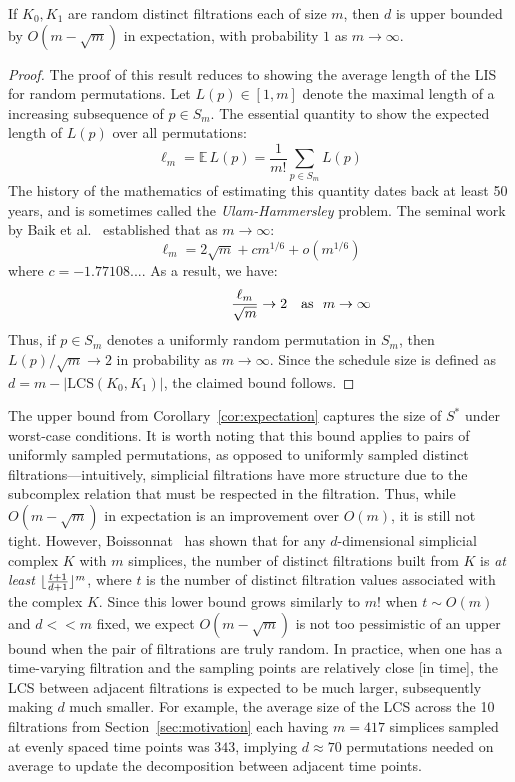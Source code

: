 \documentclass{siamart190516}
\DeclarePairedDelimiter\floor{\lfloor}{\rfloor}
\begin{document}
\begin{corollary}\label{cor:expectation}
	If $K_0, K_1$ are random distinct filtrations each of size $m$, then $d$ is upper bounded by $O(m - \sqrt{m})$ in expectation, with probability $1$ as $m \to \infty$.
\end{corollary}
\begin{proof}
	The proof of this result reduces to showing the average length of the LIS for random permutations. Let $L(p) \in [1,m]$ denote the maximal length of a increasing subsequence of $p \in S_m$. 
	The essential quantity to show the expected length of $L(p)$ over all permutations: 
	$$ \ell_m = \mathbb{E} \, L(p) = \frac{1}{m!} \sum\limits_{p \in S_m} L(p)$$
	The history of the mathematics of estimating this quantity dates back at least 50 years, and is sometimes called the \emph{Ulam-Hammersley} problem. The seminal work by Baik et al.~\cite{baik1999distribution} established that as $m \to \infty$:
	$$ \displaystyle \ell_m = 2 \sqrt{m} + c m^{1/6} + o(m^{1/6}) $$
where $c = -1.77108...$. As a result, we have: 
$$ \frac{\ell_m}{\sqrt{m}} \to 2\rlap{\quad \text{as } $m \to \infty$} $$	 
Thus, if $p \in S_m$ denotes a uniformly random permutation in $S_m$, then $L(p)/\sqrt{m} \to 2$ in probability as $m \to \infty$. 
Since the schedule size is defined as $d = m - \lvert \mathrm{LCS}(K_0, K_1) \rvert$, the claimed bound follows.
\end{proof}
\noindent The upper bound from Corollary~\ref{cor:expectation} captures the size of $S^\ast$ under worst-case conditions. It is worth noting that this bound applies to pairs of uniformly sampled permutations, as opposed to uniformly sampled distinct filtrations---intuitively, simplicial filtrations have more structure due to the subcomplex relation that must be respected in the filtration. Thus, while $O(m - \sqrt{m})$ in expectation is an improvement over $O(m)$, it is still not tight. However, Boissonnat~\cite{boissonnat2018efficient} has shown that for any $d$-dimensional simplicial complex $K$ with $m$ simplices, the number of distinct filtrations built from $K$ is \emph{at least} $\floor{\frac{t+1}{d+1}}^m$, where $t$ is the number of distinct filtration values associated with the complex $K$. Since this lower bound grows similarly to $m!$ when $t \sim O(m)$ and $d << m$ fixed, we expect $O(m - \sqrt{m})$ is not too pessimistic of an upper bound when the pair of filtrations are truly random. In practice, when one has a time-varying filtration and the sampling points are relatively close [in time], the LCS between adjacent filtrations is expected to be much larger, subsequently making $d$ much smaller. 
For example, the average size of the LCS across the 10 filtrations from Section~\ref{sec:motivation} each having $m=417$ simplices sampled at evenly spaced time points was $343$, implying $d \approx 70$ permutations needed on average to update the decomposition between adjacent time points.    
 
\end{document}
